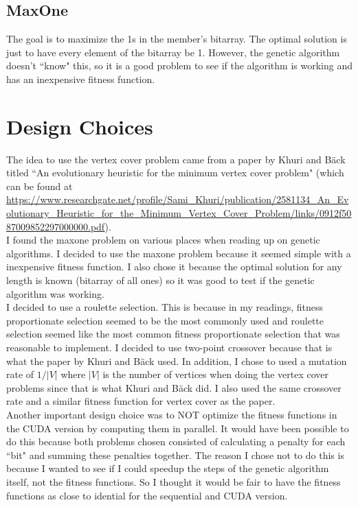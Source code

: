 \documentclass[9pt]{article}
\begin{document}
	\subsection{MaxOne} The goal is to maximize the 1s in the member's bitarray. The optimal solution is just to have every element of the bitarray be 1. However, the genetic algorithm doesn't ``know" this, so it is a good problem to see if the algorithm is working and has an inexpensive fitness function.


\section{Design Choices}
The idea to use the vertex cover problem came from a paper by Khuri and B{\"a}ck titled ``An evolutionary heuristic for the minimum vertex cover problem" (which can be found at \url{https://www.researchgate.net/profile/Sami_Khuri/publication/2581134_An_Evolutionary_Heuristic_for_the_Minimum_Vertex_Cover_Problem/links/0912f5087009852297000000.pdf}).\\

I found the maxone problem on various places when reading up on genetic algorithms. I decided to use the maxone problem because it seemed simple with a inexpensive fitness function. I also chose it because the optimal solution for any length is known (bitarray of all ones) so it was good to test if the genetic algorithm was working.\\

I decided to use a roulette selection. This is because in my readings, fitness proportionate selection seemed to be the most commonly used and roulette selection seemed like the most common fitness proportionate selection that was reasonable to implement. I decided to use two-point crossover because that is what the paper by Khuri and B{\"a}ck used. In addition, I chose to used a mutation rate of $1/|V|$ where $|V|$ is the number of vertices when doing the vertex cover problems since that is what Khuri and B{\"a}ck did. I also used the same crossover rate and a similar fitness function for vertex cover as the paper.\\

Another important design choice was to NOT optimize the fitness functions in the CUDA version by computing them in parallel. It would have been possible to do this because both problems chosen consisted of calculating a penalty for each ``bit" and summing these penalties together. The reason I chose not to do this is because I wanted to see if I could speedup the steps of the genetic algorithm itself, not the fitness functions. So I thought it would be fair to have the fitness functions as close to idential for the sequential and CUDA version.\\
\end{document}
